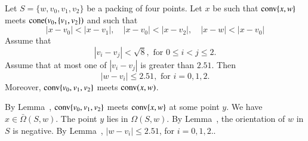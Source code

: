 \begin{tarskidata}
\begin{tarski}

\begin{lemma}
Let $S=\{w,v_0,v_1,v_2\}$ be a packing of four points.
Let $x$ be such that
  ${\operatorname{conv}}\{x,w\}$ meets ${\operatorname{cone}}(v_0,\{v_1,v_2\})$ and such that
  $$
  |x-v_0| < |x-v_1|,\quad 
  |x-v_0| < |x-v_2|,\quad
  |x-w| < |x-v_0|
  $$
Assume that 
  $$
  |v_i-v_j|< \sqrt{8}, \text{ for } 0\le i < j \le 2.
  $$
Assume that at most one of $|v_i-v_j|$ is greater than $2.51$.
Then
  $$|w-v_i|\le 2.51,\text{ for } i=0,1,2.$$
Moreover, ${\operatorname{conv}}\{v_0,v_1,v_2\}$ meets ${\operatorname{conv}}(x,w)$.
\end{lemma}


\begin{proved}
By Lemma~, ${\operatorname{conv}}\{v_0,v_1,v_2\}$ meets ${\operatorname{conv}}\{x,w\}$ at some point $y$.
We have $x\in\bar\Omega(S,w)$.  The point $y$ lies in $\Omega(S,w)$.  By Lemma~,
the orientation of $w$ in $S$ is negative.  By Lemma~, $|w-v_i|\le 2.51$, for
$i=0,1,2.$.
%
%
\swallowed\end{proved}
\end{tarski}







\end{tarskidata}
